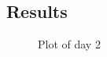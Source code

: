 \subsection{Results}

\begin{figure}[htb]
	\centering
	\caption{Plot of day 2}
	\label{fig:day2_plot}
\end{figure}



